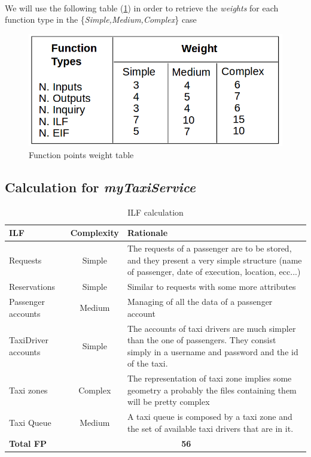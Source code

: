 \paragraph{} We will use the following table (\ref{fp:weightTable}) in order to retrieve the \textit{weights} for each function type in the \{\textit{Simple,Medium,Complex}\} case
\begin{figure}[H]
	\centering
	\includegraphics[scale = 0.4]{Size_Cost_Effort/fp_table}
	\caption{Function points weight table}
	\label{fp:weightTable}
\end{figure}

\subsection{Calculation for \textit{myTaxiService}}

\begin{table}[H]
\centering
\begin{tabular}{ l | c | p{} }
\textbf{ILF} & \textbf{Complexity} & \textbf{Rationale} \\ \hline
Requests & Simple & The requests of a passenger are to be stored, and they present a very simple structure (name of passenger, date of execution, location, ecc...) \\ \hline
Reservations & Simple & Similar to requests with some more attributes \\ \hline
Passenger accounts & Medium & Managing of all the data of a passenger account \\ \hline
TaxiDriver accounts & Simple & The accounts of taxi drivers are much simpler than the one of passengers. They consist simply in a username and password and the id of the taxi. \\ \hline
Taxi zones & Complex & The representation of taxi zone implies some geometry a probably the files containing them will be pretty complex \\ \hline
Taxi Queue & Medium & A taxi queue is composed by a taxi zone and the set of available taxi drivers that are in it. \\ \hline
\textbf{Total FP} & \multicolumn{2}{c}{\textbf{56}}
\end{tabular}
\caption{ILF calculation}
\end{table}

